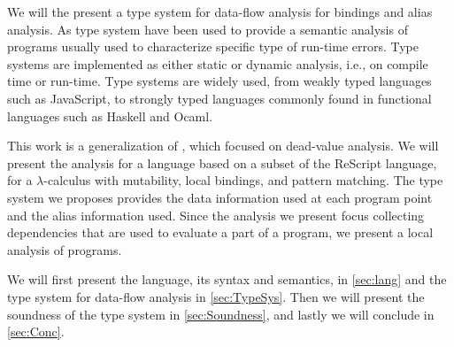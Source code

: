 \documentclass[../../master.tex]{subfiles}
\begin{document}
We will the present a type system for data-flow analysis for bindings and alias analysis.
As type system have been used to provide a semantic analysis of programs usually used to characterize specific type of run-time errors.
Type systems are implemented as either static or dynamic analysis, i.e., on compile time or run-time.
Type systems are widely used, from weakly typed languages such as JavaScript, to strongly typed languages commonly found in functional languages such as Haskell and Ocaml.

This work is a generalization of \cite{DVNicky}, which focused on dead-value analysis.
We will present the analysis for a language based on a subset of the ReScript language, for a $\lambda$-calculus with mutability, local bindings, and pattern matching.
The type system we proposes provides the data information used at each program point and the alias information used.
Since the analysis we present focus collecting dependencies that are used to evaluate a part of a program, we present a local analysis of programs.
\bigskip

We will first present the language, its syntax and semantics, in \cref{sec:lang} and the type system for data-flow analysis in \cref{sec:TypeSys}.
Then we will present the soundness of the type system in \cref{sec:Soundness}, and lastly we will conclude in \cref{sec:Conc}.
\end{document}
